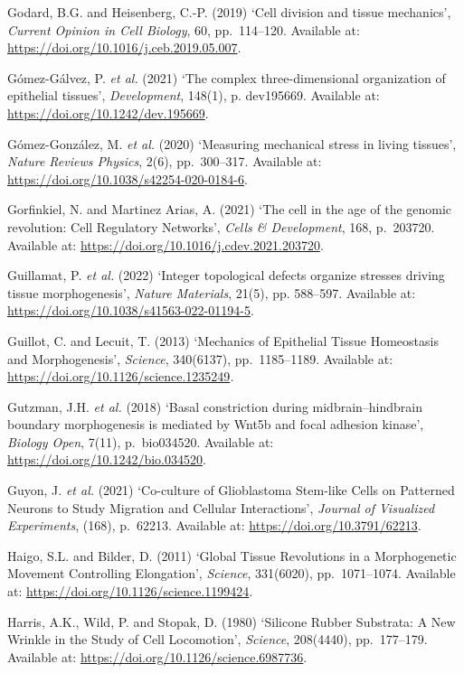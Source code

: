 \documentclass[
]{article}
\begin{document}
Godard, B.G. and Heisenberg, C.-P. (2019) `Cell division and tissue
mechanics', \emph{Current Opinion in Cell Biology}, 60, pp.~114--120.
Available at: \url{https://doi.org/10.1016/j.ceb.2019.05.007}.

Gómez-Gálvez, P. \emph{et al.} (2021) `The complex three-dimensional
organization of epithelial tissues', \emph{Development}, 148(1), p.
dev195669. Available at: \url{https://doi.org/10.1242/dev.195669}.

Gómez-González, M. \emph{et al.} (2020) `Measuring mechanical stress in
living tissues', \emph{Nature Reviews Physics}, 2(6), pp.~300--317.
Available at: \url{https://doi.org/10.1038/s42254-020-0184-6}.

Gorfinkiel, N. and Martinez Arias, A. (2021) `The cell in the age of the
genomic revolution: Cell Regulatory Networks', \emph{Cells \&
Development}, 168, p.~203720. Available at:
\url{https://doi.org/10.1016/j.cdev.2021.203720}.

Guillamat, P. \emph{et al.} (2022) `Integer topological defects organize
stresses driving tissue morphogenesis', \emph{Nature Materials}, 21(5),
pp. 588--597. Available at:
\url{https://doi.org/10.1038/s41563-022-01194-5}.

Guillot, C. and Lecuit, T. (2013) `Mechanics of Epithelial Tissue
Homeostasis and Morphogenesis', \emph{Science}, 340(6137),
pp.~1185--1189. Available at:
\url{https://doi.org/10.1126/science.1235249}.

Gutzman, J.H. \emph{et al.} (2018) `Basal constriction during
midbrain--hindbrain boundary morphogenesis is mediated by Wnt5b and
focal adhesion kinase', \emph{Biology Open}, 7(11), p.~bio034520.
Available at: \url{https://doi.org/10.1242/bio.034520}.

Guyon, J. \emph{et al.} (2021) `Co-culture of Glioblastoma Stem-like
Cells on Patterned Neurons to Study Migration and Cellular
Interactions', \emph{Journal of Visualized Experiments}, (168),
p.~62213. Available at: \url{https://doi.org/10.3791/62213}.

Haigo, S.L. and Bilder, D. (2011) `Global Tissue Revolutions in a
Morphogenetic Movement Controlling Elongation', \emph{Science},
331(6020), pp.~1071--1074. Available at:
\url{https://doi.org/10.1126/science.1199424}.

Harris, A.K., Wild, P. and Stopak, D. (1980) `Silicone Rubber Substrata:
A New Wrinkle in the Study of Cell Locomotion', \emph{Science},
208(4440), pp.~177--179. Available at:
\url{https://doi.org/10.1126/science.6987736}.
\end{document}
